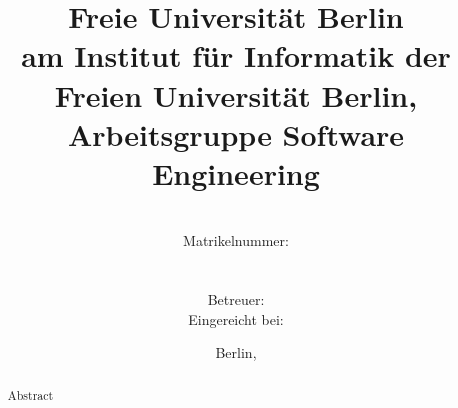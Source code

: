 \documentclass[11pt,a4paper,ngerman]{article}
\title{{\huge\bfseries Freie Universität Berlin}\\[2ex]
{\normalsize \thesisType{} am Institut für Informatik der Freien Universität
Berlin, Arbeitsgruppe Software Engineering}\\[6ex]
\thesisTitle}
\author{\studentName\\
{\normalsize Matrikelnummer: }\\
{\normalsize \mailto{\studentEmail}}\\\\
{\normalsize Betreuer: }\\
{\normalsize Eingereicht bei: }}
\date{Berlin, \thesisDate}
\begin{document}
\begin{titlepage}

\maketitle
\thispagestyle{empty}

\vfill{}

\begin{abstract}
Abstract
\end{abstract}

\vfill{}

\end{titlepage}

\pagestyle{empty}
\clearpage{}



\tableofcontents

\clearpage{}
\pagestyle{fancy}
\setcounter{page}{1}





\appendix




\end{document}
